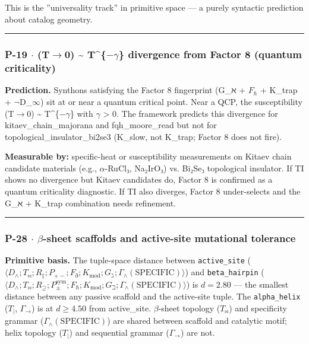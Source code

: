 \documentclass[12pt,a4paper]{article}
\begin{document}
This is the ''universality track'' in primitive space --- a purely syntactic prediction about catalog geometry.

\begin{center}
\rule{0.5\textwidth}{0.4pt}
\end{center}

\subsubsection{P-19 $\cdot$ \chi(T$\rightarrow$0) \textasciitilde{} T\^{}\{$-$$\gamma$\} divergence from Factor 8 (quantum criticality)}

\textbf{Prediction.} Synthons satisfying the Factor 8 fingerprint (G\_ℵ + $F_{\hbar}$ + K\_trap + $\neg$D\_$\infty$) sit at or near a quantum critical point. Near a QCP, the susceptibility \chi(T$\rightarrow$0) \textasciitilde{} T\^{}\{$-$$\gamma$\} with $\gamma$ \textgreater{} 0. The framework predicts this divergence for kitaev\_chain\_majorana and fqh\_moore\_read but not for topological\_insulator\_bi2se3 (K\_slow, not K\_trap; Factor 8 does not fire).

\textbf{Measurable by:} specific-heat or susceptibility measurements on Kitaev chain candidate materials (e.g., $\alpha$-RuCl₃, Na₂IrO₃) vs. Bi₂Se₃ topological insulator. If TI shows no divergence but Kitaev candidates do, Factor 8 is confirmed as a quantum criticality diagnostic. If TI also diverges, Factor 8 under-selects and the G\_ℵ + K\_trap combination needs refinement.

\begin{center}
\rule{0.5\textwidth}{0.4pt}
\end{center}

\subsubsection{P-28 $\cdot$ $\beta$-sheet scaffolds and active-site mutational tolerance}

\textbf{Primitive basis.} The tuple-space distance between \texttt{active\_site} ($\langle D_\wedge; T_\bowtie; R_\ddagger; P_{+-}; F_\eth; K_\text{mod}; G_\gimel; \Gamma_\wedge(\text{SPECIFIC})\rangle$) and \texttt{beta\_hairpin} ($\langle D_\wedge; T_\bowtie; R_\supseteq; P_\pm^\text{sym}; F_\hbar; K_\text{mod}; G_\beth; \Gamma_\wedge(\text{SPECIFIC})\rangle$) is $d = 2.80$ --- the smallest distance between any passive scaffold and the active-site tuple. The \texttt{alpha\_helix} ($T_{\vert}$, $\Gamma_\to$) is at $d \geq 4.50$ from active\_site. $\beta$-sheet topology ($T_\bowtie$) and specificity grammar ($\Gamma_\wedge(\text{SPECIFIC})$) are shared between scaffold and catalytic motif; helix topology ($T_{\vert}$) and sequential grammar ($\Gamma_\to$) are not.
\end{document}
